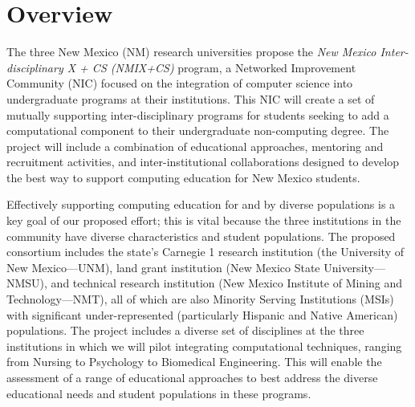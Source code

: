 \section{Overview}
\label{sec:overview}

The three New Mexico (NM) research universities propose the \emph{New Mexico Inter-disciplinary X + CS (NMIX+CS)} program, a Networked Improvement Community (NIC) focused on the integration of computer science into undergraduate programs at their institutions. This NIC will create a set of mutually supporting inter-disciplinary programs for students seeking to add a computational component to their undergraduate non-computing degree. The project will include a combination of educational approaches, mentoring and recruitment activities, and inter-institutional collaborations designed to develop the best way to support computing education for New Mexico students.

Effectively supporting computing education for and by diverse populations is a key goal of our proposed effort; this is vital because the three institutions in the community have diverse characteristics and student populations.  The proposed consortium includes the state's Carnegie 1 research institution (the University of New Mexico---UNM), land grant institution (New Mexico State University---NMSU), and technical research institution (New Mexico Institute of Mining and Technology---NMT), all of which
are also Minority Serving Institutions (MSIs) with significant under-represented (particularly Hispanic
and Native American) populations. The project includes a diverse set of disciplines at the three institutions in which we will pilot integrating computational techniques, ranging from Nursing to Psychology to Biomedical Engineering. This will enable the assessment of a range of educational approaches to best address the diverse educational needs and student populations in these programs.

